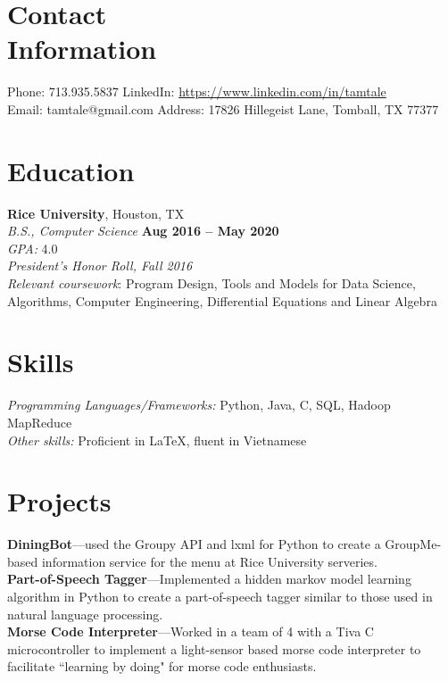 \documentclass[margin,line]{resume}
\begin{document}
\begin{resume}
    \section{\mysidestyle Contact\\Information}

    Phone: 713.935.5837       \hfill LinkedIn: \url{https://www.linkedin.com/in/tamtale
} \\
    \noindent Email: tamtale@gmail.com  \hfill
    Address: 17826 Hillegeist Lane, Tomball, TX 77377

    \section{\mysidestyle Education}

    \textbf{Rice University}, Houston, TX \vspace{1mm}\\
    \textsl{B.S., Computer Science} \hfill \textbf{Aug 2016 -- May 2020} \vspace{1mm}\\
    \textsl{GPA: } 4.0 \vspace{1mm}\\
    \textsl{President's Honor Roll, Fall 2016} \vspace{1mm} \\
    \textsl{Relevant coursework}: Program Design, Tools and Models for Data Science, Algorithms, Computer Engineering, Differential Equations and Linear Algebra

    \section{\mysidestyle Skills}

    \emph{Programming Languages/Frameworks:} Python, Java, C, SQL, Hadoop MapReduce \\
    \emph{Other skills:} Proficient in \LaTeX, fluent in Vietnamese

    \section{\mysidestyle Projects}

    \textbf{DiningBot}---used the Groupy API and lxml for Python to create a GroupMe-based information service for the menu at Rice University serveries.\vspace{1mm}\\
    \textbf{Part-of-Speech Tagger}---Implemented a hidden markov model learning algorithm in Python to create a part-of-speech tagger similar to those used in natural language processing.\vspace{1mm}\\
    \textbf{Morse Code Interpreter}---Worked in a team of 4 with a Tiva C microcontroller to implement a light-sensor based morse code interpreter to facilitate ``learning by doing" for morse code enthusiasts.


\end{resume}
\end{document}

